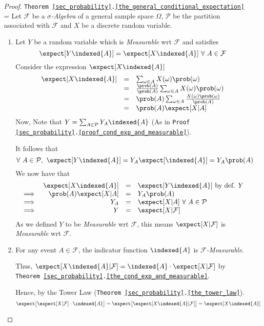 \documentclass[11pt,a4paper]{article}
\begin{document}
  \begin{proof}{\texttt{Theorem \ref{sec_probability}.\ref{the_general_conditional_expectation}}}
    \everymath={\displaystyle}
    Let $\mathcal{F}$ be a \textit{$\sigma$-Algebra} of a general sample space $\Omega$, $\mathcal{P}$ be the partition associated with $\mathcal{F}$ and $X$ be a discrete random variable.
    \begin{enumerate}
      \item
      Let $Y$ be a random variable which is \textit{Measurable} wrt $\mathcal{F}$ and satisfies
      \[ \expect[Y\indexed\{A\}]=\expect[X\indexed\{A\}]\ \forall\ A\in\mathcal{F} \]
      Consider the expression $\expect[X\indexed\{A\}]$
      \[\begin{array}{rcl}
        \expect[X\indexed\{A\}]&=&\sum_{\omega\in A}X(\omega)\prob(\omega)\\
        &=&\frac{\prob(A)}{\prob(A)}\sum_{\omega\in A}X(\omega)\prob(\omega)\\
        &=&\prob(A)\sum_{\omega\in A}\frac{X(\omega)\prob(\omega)}{\prob(A)}\\
        &=&\prob(A)\expect[X|A]
      \end{array}\]
      Now, Note that $Y=\sum_{A\in\mathcal{P}}Y_A\indexed\{A\}$ (As in \texttt{Proof \ref{sec_probability}.\ref{proof_cond_exp_and_measurable}}).
      \par It follows that
      \[ \forall\ A\in\mathcal{P},\ \expect[Y\indexed\{A\}]=Y_A\expect[\indexed\{A\}]=Y_A\prob(A) \]
      We now have that
      \[\begin{array}{rrcl}
        &\expect[X\indexed\{A\}]&=&\expect[Y\indexed\{A\}]\text{ by def. }Y\\
        \implies&\prob(A)\expect[X|A]&=&Y_A\prob(A)\\
        \implies&Y_A&=&\expect[X|A]\ \forall\ A\in\mathcal{P}\\
        \implies&Y&=&\expect[X|\mathcal{F}]
      \end{array}\]
      As we defined $Y$ to be \textit{Measurable} wrt $\mathcal{F}$, this means $\expect[X|\mathcal{F}]$ is \textit{Measurable} wrt $\mathcal{F}$.

      \item \par For any event $A\in\mathcal{F}$, the indicator function $\indexed\{A\}$ is \textit{$\mathcal{F}$-Measurable}.
      \par Thus, $\expect[X\indexed\{A\}|\mathcal{F}]=\indexed\{A\}\cdot\expect[X|\mathcal{F}]$ by \texttt{Theorem \ref{sec_probability}.\ref{the_cond_exp_and_measurable}}.
      \par Hence, by the Tower Law (\texttt{Theorem \ref{sec_probability}.\ref{the_tower_law}}).
      \[ \expect\big[\expect[X|\mathcal{F}]\cdot\indexed\{A\}\big]=\expect\big[\expect[X\indexed\{A\}|\mathcal{F}]\big]=\expect[X\indexed\{A\}] \]
    \end{enumerate}
    \proved
  \end{proof}
\end{document}
